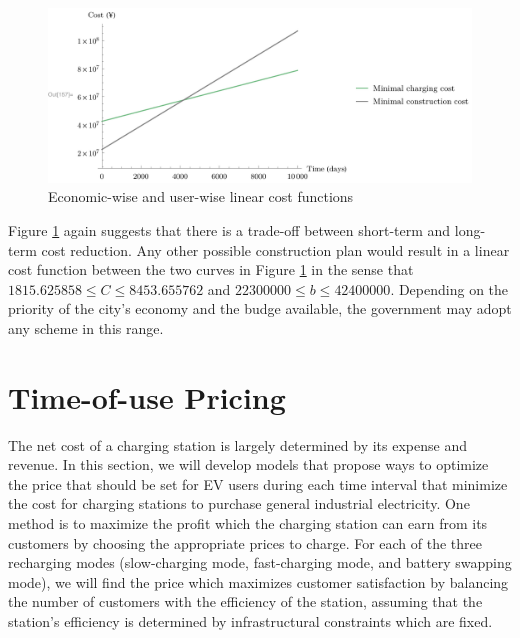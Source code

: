 \documentclass[10pt]{article}
\begin{document}
\begin{figure}[htbp]
    \centering
    \includegraphics[scale=.62,trim=45pt 0 0 0,clip]{linear_plot.pdf}
    \caption{Economic-wise and user-wise linear cost functions}
    \label{fig:opt_lcf}
\end{figure}

Figure \ref{fig:opt_lcf} again suggests that there is a trade-off between short-term and long-term cost reduction. Any other possible construction plan would result in a linear cost function between the two curves in Figure \ref{fig:opt_lcf} in the sense that $1815.625858 \le C \le 8453.655762$ and $22300000 \le b \le 42400000$. Depending on the priority of the city's economy and the budge available, the government may adopt any scheme in this range.

\section{Time-of-use Pricing}

The net cost of a charging station is largely determined by its expense and revenue. In this section, we will develop models that propose ways to optimize the price that should be set for EV users during each time interval that minimize the cost for charging stations to purchase general industrial electricity. One method is to maximize the profit which the charging station can earn from its customers by choosing the appropriate prices to charge. For each of the three recharging modes (slow-charging mode, fast-charging mode, and battery swapping mode), we will find the price which maximizes customer satisfaction by balancing the number of customers with the efficiency of the station, assuming that the station's efficiency is determined by infrastructural constraints which are fixed.
\end{document}
